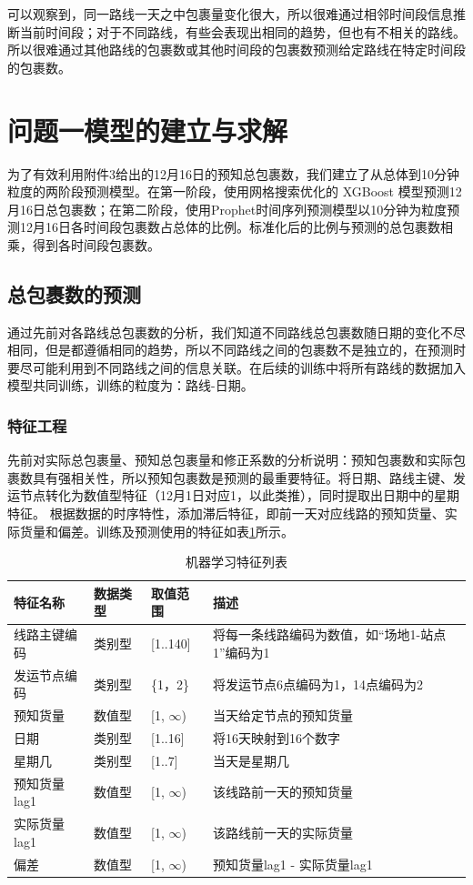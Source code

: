 \documentclass{MMCStyle}
\begin{document}
可以观察到，同一路线一天之中包裹量变化很大，所以很难通过相邻时间段信息推断当前时间段；对于不同路线，有些会表现出相同的趋势，但也有不相关的路线。所以很难通过其他路线的包裹数或其他时间段的包裹数预测给定路线在特定时间段的包裹数。

\section{问题一模型的建立与求解}

为了有效利用附件3给出的12月16日的预知总包裹数，我们建立了从总体到10分钟粒度的两阶段预测模型。在第一阶段，使用网格搜索优化的 XGBoost 模型预测12月16日总包裹数；在第二阶段，使用Prophet时间序列预测模型以10分钟为粒度预测12月16日各时间段包裹数占总体的比例。标准化后的比例与预测的总包裹数相乘，得到各时间段包裹数。

\subsection{总包裹数的预测}
通过先前对各路线总包裹数的分析，我们知道不同路线总包裹数随日期的变化不尽相同，但是都遵循相同的趋势，所以不同路线之间的包裹数不是独立的，在预测时要尽可能利用到不同路线之间的信息关联。在后续的训练中将所有路线的数据加入模型共同训练，训练的粒度为：路线-日期。

\subsubsection{特征工程}
先前对实际总包裹量、预知总包裹量和修正系数的分析说明：预知包裹数和实际包裹数具有强相关性，所以预知包裹数是预测的最重要特征。将日期、路线主键、发运节点转化为数值型特征（12月1日对应1，以此类推），同时提取出日期中的星期特征。
根据数据的时序特性，添加滞后特征，即前一天对应线路的预知货量、实际货量和偏差。训练及预测使用的特征如表\ref{tab:2}所示。

\begin{table}[htbp]
\centering
\caption{机器学习特征列表}
\label{tab:2}
\begin{tabular}{lllp{6cm}}
\toprule
\textbf{特征名称} & \textbf{数据类型} & \textbf{取值范围} & \textbf{描述} \\
\midrule
线路主键编码 & 类别型 & [1..140] & 将每一条线路编码为数值，如“场地1-站点1”编码为1 \\
发运节点编码 & 类别型 & \{1，2\} & 将发运节点6点编码为1，14点编码为2 \\
预知货量 & 数值型 & [1, \(\infty\)) & 当天给定节点的预知货量 \\
日期 & 类别型 & [1..16] & 将16天映射到16个数字 \\
星期几 & 类别型 & [1..7] & 当天是星期几 \\
预知货量lag1 & 数值型 & [1, \(\infty\)) & 该线路前一天的预知货量\\
实际货量lag1 & 数值型 & [1, \(\infty\)) & 该路线前一天的实际货量\\
偏差 & 数值型 & [1, \(\infty\)) & 预知货量lag1 - 实际货量lag1 \\
\bottomrule
\end{tabular}
\end{table}
\end{document}
